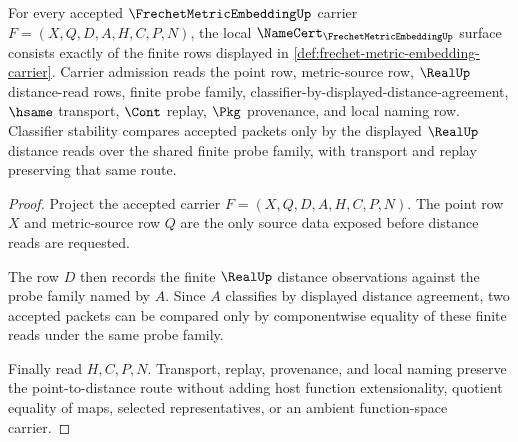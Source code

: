 \begin{theorem}
\label{thm:frechet-metric-embedding-namecert-obligations}
For every accepted $\FrechetMetricEmbeddingUp$ carrier $F=(X,Q,D,A,H,C,P,N)$, the local $\NameCert_{\FrechetMetricEmbeddingUp}$ surface consists exactly of the finite rows displayed in \autoref{def:frechet-metric-embedding-carrier}. Carrier admission reads the point row, metric-source row, $\RealUp$ distance-read rows, finite probe family, classifier-by-displayed-distance-agreement, $\hsame$ transport, $\Cont$ replay, $\Pkg$ provenance, and local naming row. Classifier stability compares accepted packets only by the displayed $\RealUp$ distance reads over the shared finite probe family, with transport and replay preserving that same route.
\end{theorem}
\begin{proof}
Project the accepted carrier $F=(X,Q,D,A,H,C,P,N)$. The point row $X$ and metric-source row $Q$ are the only source data exposed before distance reads are requested.

The row $D$ then records the finite $\RealUp$ distance observations against the probe family named by $A$. Since $A$ classifies by displayed distance agreement, two accepted packets can be compared only by componentwise equality of these finite reads under the same probe family.

Finally read $H,C,P,N$. Transport, replay, provenance, and local naming preserve the point-to-distance route without adding host function extensionality, quotient equality of maps, selected representatives, or an ambient function-space carrier.
\end{proof}


\begin{closurestatus}{\FrechetMetricEmbeddingUp}
  \theoryclosure{\seedClosure}
  \formalstatus{\unformalizedV}
\end{closurestatus}
